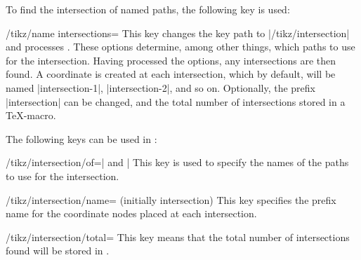 To find the intersection of named paths, the following key is used:

\begin{key}{/tikz/name intersections=}
  This key changes the key path to |/tikz/intersection| and processes
  . These options determine, among other things,
  which paths to use for the intersection. Having processed the
  options, any intersections are then found. A coordinate is created
  at each intersection, which by default, will be named
  |intersection-1|, |intersection-2|, and so on.
  Optionally, the prefix |intersection| can be changed, and the
  total number of intersections stored in a \TeX-macro.

\begin{codeexample}[]
\end{codeexample}

The following keys can be used in :

\begin{key}{/tikz/intersection/of=| and |}
  This key is used to specify the names of the paths to use for
  the intersection.
\end{key}

\begin{key}{/tikz/intersection/name= (initially intersection)}
  This key specifies the prefix name for the coordinate nodes placed
  at each intersection.
\end{key}

\begin{key}{/tikz/intersection/total=}
  This key means that the total number of intersections found
  will be stored in .
\end{key}

\begin{codeexample}[]
\end{codeexample}
\end{key}
